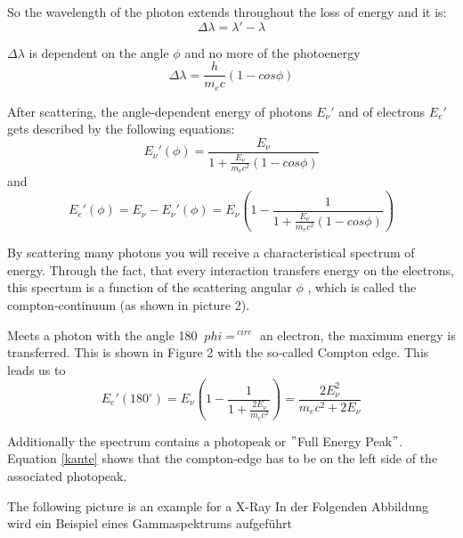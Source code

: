 
So the wavelength of the photon extends throughout the loss of energy and it is:
	\begin{equation}
	\Delta \lambda = \lambda ' - \lambda
	\end{equation}

$\Delta \lambda$ is dependent on the angle $\phi$ and no more of the photoenergy
	\begin{equation}
	\Delta \lambda = \frac{h}{m_{e} c}(1-cos \phi)
	\end{equation}

After scattering, the angle-dependent energy of photons $E_{\nu}'$ and of electrons $E_{e}'$ gets described by the following equations:
	\begin{equation}
	E_{\nu}'(\phi) = \frac{E_{\nu}}{1+\frac{E_{\nu}}{m_{e}c^{2}}(1-cos 			\phi)}
	\end{equation}
and
	\begin{equation}
	E_{e}'(\phi) = E_{\nu}-E_{\nu}'(\phi) = E_{\nu}\left(1-\frac{1}{1+\frac{E_{\nu}}{m_{e}c^{2}}(1-cos \phi)}\right)
	\end{equation}

By scattering many photons you will receive a characteristical spectrum of energy. Through the fact, that every interaction transfers energy on the electrons, this specrtum is a function of the scattering angular $\phi$ , which is called the compton-continuum (as shown in picture 2).


Meets a photon with the angle 180 $ \ phi = ^ {\ circ} $ an electron, the maximum energy is transferred. This is shown in Figure 2 with the so-called Compton edge. This leads us to	
	\begin{equation}
	\label{kante}
	E_{e}'(180^{\circ}) = E_{\nu} \left(1-\frac{1}{1+\frac{2E_{\nu}}{m_{e}c^{2}}}\right) = \frac{2E_{\nu}^{2}}{m_{e}c^{2} +2E_{\nu}}
	\end{equation}

Additionally the spectrum contains a photopeak or $"$Full Energy Peak$"$. Equation \eqref{kante} shows that the compton-edge has to be on the left side of the associated photopeak.

The following picture is an example for a X-Ray In der Folgenden Abbildung wird ein Beispiel eines Gammaspektrums aufgeführt\\

